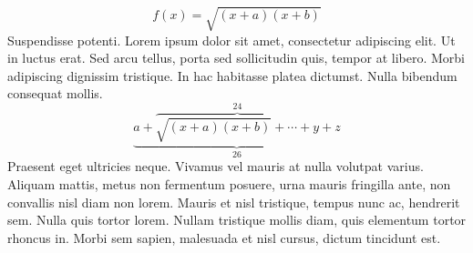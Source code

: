 \begin{frame}
\begin{equation} f(x)=\sqrt{(x+a)(x+b)} \end{equation}
Suspendisse potenti. Lorem ipsum dolor sit amet, consectetur adipiscing elit. Ut in luctus erat. Sed arcu tellus, porta sed sollicitudin quis, tempor at libero. Morbi adipiscing dignissim tristique. In hac habitasse platea dictumst. Nulla bibendum consequat mollis.
$$ \underbrace{a+\overbrace{\sqrt{(x+a)(x+b)}+\cdots+y}^{24}+z}_{26} $$
Praesent eget ultricies neque. Vivamus vel mauris at nulla volutpat varius. Aliquam mattis, metus non fermentum posuere, urna mauris fringilla ante, non convallis nisl diam non lorem. Mauris et nisl tristique, tempus nunc ac, hendrerit sem. Nulla quis tortor lorem. Nullam tristique mollis diam, quis elementum tortor rhoncus in. Morbi sem sapien, malesuada et nisl cursus, dictum tincidunt est.
\end{frame}
